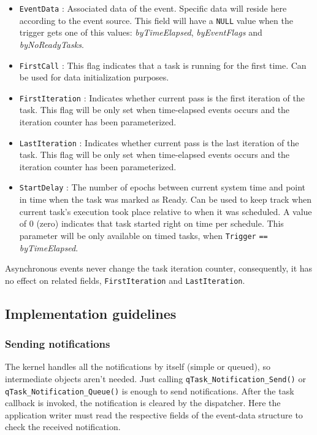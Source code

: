 \documentclass{article}
\begin{document}
\begin{itemize}
    \item \lstinline{EventData} : Associated data of the event. Specific data will reside here according to the event source. This field will have a \lstinline{NULL} value when the trigger gets one of this values:  \textit{byTimeElapsed}, \textit{byEventFlags} and \textit{byNoReadyTasks}.
    \item \lstinline{FirstCall} : This flag indicates that a task is running for the first time. Can be used for data initialization purposes.
    \item \lstinline{FirstIteration} : Indicates whether current pass is the first iteration of the task. This flag will be only set when time-elapsed events occurs and the iteration counter has been parameterized. 
    \item \lstinline{LastIteration} : Indicates whether current pass is the last iteration of the task. This flag will be only set when time-elapsed events occurs and the iteration counter has been parameterized. 
    \item \lstinline{StartDelay} : The number of epochs between current system time and point in time when the task was marked as Ready.
    Can be used to keep track when current task's execution took place relative to when it was scheduled. A value of 0 (zero) indicates that task started right on time per schedule.
    This parameter will be only available on timed tasks, when \lstinline{Trigger} \lstinline{==} \textit{byTimeElapsed}. 
\end{itemize}    

\begin{tcolorbox}
\HandRight Asynchronous events never change the task iteration counter, consequently, it has no effect on related fields, \lstinline{FirstIteration} and \lstinline{LastIteration}.
\end{tcolorbox}
    
\subsection{Implementation guidelines}
\subsubsection{Sending notifications}

The kernel handles all the notifications by itself (simple or queued), so intermediate objects aren't needed. Just calling \lstinline{qTask_Notification_Send()} or \lstinline{qTask_Notification_Queue()} is enough to send notifications. After the task callback is invoked, the notification is cleared by the dispatcher. Here the application writer must read the respective fields of the event-data structure to check the received notification. \\
\end{document}
